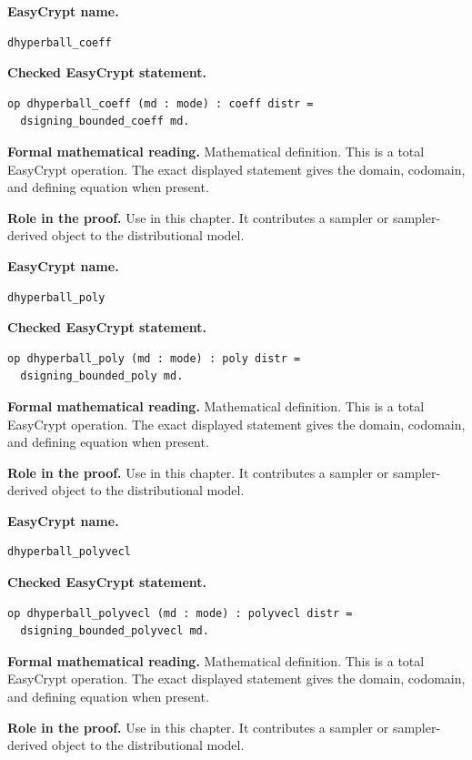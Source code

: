 \begin{formaldefinition}
\noindent\textbf{EasyCrypt name.}
\begin{lstlisting}[language=EasyCrypt,basicstyle=\ttfamily\scriptsize]
dhyperball_coeff
\end{lstlisting}
\noindent\textbf{Checked EasyCrypt statement.}
\begin{lstlisting}[language=EasyCrypt,basicstyle=\ttfamily\scriptsize]
op dhyperball_coeff (md : mode) : coeff distr =
  dsigning_bounded_coeff md.
\end{lstlisting}
\noindent\textbf{Formal mathematical reading.}
Mathematical definition. This is a total EasyCrypt operation.  The exact displayed statement gives the domain, codomain, and defining equation when present.

\noindent\textbf{Role in the proof.}
Use in this chapter. It contributes a sampler or sampler-derived object to the distributional model.

\end{formaldefinition}

\begin{formaldefinition}
\noindent\textbf{EasyCrypt name.}
\begin{lstlisting}[language=EasyCrypt,basicstyle=\ttfamily\scriptsize]
dhyperball_poly
\end{lstlisting}
\noindent\textbf{Checked EasyCrypt statement.}
\begin{lstlisting}[language=EasyCrypt,basicstyle=\ttfamily\scriptsize]
op dhyperball_poly (md : mode) : poly distr =
  dsigning_bounded_poly md.
\end{lstlisting}
\noindent\textbf{Formal mathematical reading.}
Mathematical definition. This is a total EasyCrypt operation.  The exact displayed statement gives the domain, codomain, and defining equation when present.

\noindent\textbf{Role in the proof.}
Use in this chapter. It contributes a sampler or sampler-derived object to the distributional model.

\end{formaldefinition}

\begin{formaldefinition}
\noindent\textbf{EasyCrypt name.}
\begin{lstlisting}[language=EasyCrypt,basicstyle=\ttfamily\scriptsize]
dhyperball_polyvecl
\end{lstlisting}
\noindent\textbf{Checked EasyCrypt statement.}
\begin{lstlisting}[language=EasyCrypt,basicstyle=\ttfamily\scriptsize]
op dhyperball_polyvecl (md : mode) : polyvecl distr =
  dsigning_bounded_polyvecl md.
\end{lstlisting}
\noindent\textbf{Formal mathematical reading.}
Mathematical definition. This is a total EasyCrypt operation.  The exact displayed statement gives the domain, codomain, and defining equation when present.

\noindent\textbf{Role in the proof.}
Use in this chapter. It contributes a sampler or sampler-derived object to the distributional model.

\end{formaldefinition}

